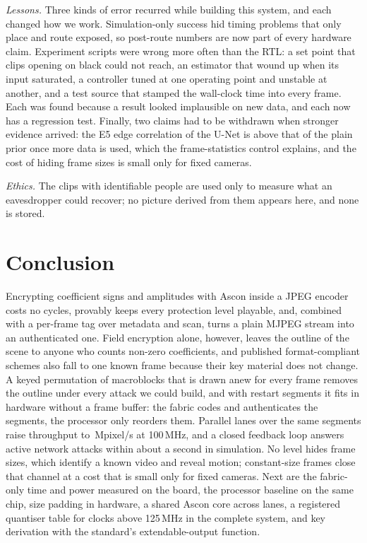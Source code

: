 \textit{Lessons.} Three kinds of error recurred while building this system, and each changed how we work. Simulation-only success hid timing problems that only place and route exposed, so post-route numbers are now part of every hardware claim. Experiment scripts were wrong more often than the RTL: a set point that clips opening on black could not reach, an estimator that wound up when its input saturated, a controller tuned at one operating point and unstable at another, and a test source that stamped the wall-clock time into every frame. Each was found because a result looked implausible on new data, and each now has a regression test. Finally, two claims had to be withdrawn when stronger evidence arrived: the E5 edge correlation of the U-Net is above that of the plain prior once more data is used, which the frame-statistics control explains, and the cost of hiding frame sizes is small only for fixed cameras.

\textit{Ethics.} The clips with identifiable people are used only to measure what an eavesdropper could recover; no picture derived from them appears here, and none is stored.

\section{Conclusion}\label{sec:conclusion}
Encrypting coefficient signs and amplitudes with Ascon inside a JPEG encoder costs no cycles, provably keeps every protection level playable, and, combined with a per-frame tag over metadata and scan, turns a plain MJPEG stream into an authenticated one. Field encryption alone, however, leaves the outline of the scene to anyone who counts non-zero coefficients, and published format-compliant schemes also fall to one known frame because their key material does not change. A keyed permutation of macroblocks that is drawn anew for every frame removes the outline under every attack we could build, and with restart segments it fits in hardware without a frame buffer: the fabric codes and authenticates the segments, the processor only reorders them. Parallel lanes over the same segments raise throughput to \RtlFourLanesMpix\,Mpixel/s at 100\,MHz, and a closed feedback loop answers active network attacks within about a second in simulation. No level hides frame sizes, which identify a known video and reveal motion; constant-size frames close that channel at a cost that is small only for fixed cameras. Next are the fabric-only time and power measured on the board, the processor baseline on the same chip, size padding in hardware, a shared Ascon core across lanes, a registered quantiser table for clocks above 125\,MHz in the complete system, and key derivation with the standard's extendable-output function.

